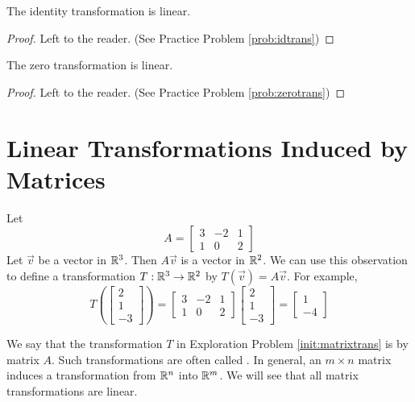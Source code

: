 \documentclass{ximera}
\begin{document}
\begin{theorem}\label{th:idlintrans}
The identity transformation is linear.
\end{theorem}
\begin{proof}
Left to the reader. (See Practice Problem \ref{prob:idtrans})
\end{proof}

\begin{theorem}\label{th:zerolintrans}
The zero transformation is linear.
\end{theorem}
\begin{proof}
Left to the reader.  (See Practice Problem \ref{prob:zerotrans})
\end{proof}

\section*{Linear Transformations Induced by Matrices}

\begin{initprob}\label{init:matrixtrans}   Let $$A=\begin{bmatrix}
3&-2&1\\
1&0&2
\end{bmatrix}$$
Let $\vec{v}$ be a vector in $\mathbb{R}^3$.  Then $A\vec{v}$ is a vector in $\mathbb{R}^2$.  We can use this observation to define a transformation $T:\mathbb{R}^3\rightarrow\mathbb{R}^2$ by $T(\vec{v})=A\vec{v}$.  For example,
$$T\left(\begin{bmatrix}
2\\
1\\
-3
\end{bmatrix}\right)=\begin{bmatrix}
3&-2&1\\
1&0&2
\end{bmatrix}\begin{bmatrix}
2\\
1\\
-3
\end{bmatrix}=\begin{bmatrix}
1\\
-4
\end{bmatrix}$$

\end{initprob}



We say that the transformation $T$ in Exploration Problem \ref{init:matrixtrans} is  by matrix $A$.  Such transformations are often called .  In general, an $m\times n$ matrix induces a transformation from $\mathbb{R}^n$ into $\mathbb{R}^m$.  We will see that all matrix transformations are linear.
\end{document}
